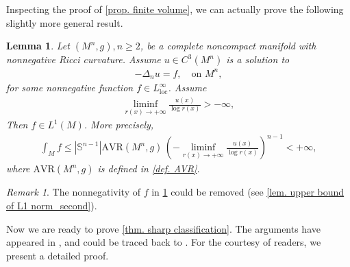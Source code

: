 \documentclass[12pt]{amsart}
\theoremstyle{plain}
\newtheorem{lemma}[theorem]{Lemma}
\theoremstyle{definition}
\theoremstyle{remark}     %
\newtheorem{remark}[theorem]{Remark}
\begin{document}
    Inspecting the proof of \cref{prop. finite volume}, we can actually prove the following slightly more general result.
    \begin{lemma}\label{lem. upper bound of L1 norm}
        Let $(M^n,g), n\geq 2$, be a complete noncompact manifold with nonnegative Ricci curvature. Assume $u\in C^3(M^n)$ is a solution to
    \begin{align*}
        -\Delta_n u=f,\quad
        \text{on }M^n,
    \end{align*}
    for some nonnegative function $f\in L^{\infty}_{\text{loc}}$. Assume 
    \begin{align*}
        \liminf_{r(x)\to+\infty}
        \frac{u(x)}{\log r(x)}>-\infty,
    \end{align*}
    Then $f\in L^1(M)$. More precisely,
    \begin{align*}
        \int_M f
        \leq |\mathbb{S}^{n-1}|\mathrm{AVR}(M^n,g)\, \left(
        -\liminf_{r(x)\to+\infty}
        \frac{u(x)}{\log r(x)}
        \right)^{n-1}<+\infty,
    \end{align*}
    where $\mathrm{AVR}(M^n,g)$ is defined in \cref{def. AVR}.
    \end{lemma}
    \begin{remark}
        The nonnegativity of $f$ in \cref{lem. upper bound of L1 norm} could be removed (see \cref{lem. upper bound of L1 norm_second}).
    \end{remark}


Now we are ready to prove \cref{thm. sharp classification}. The arguments have  appeared in \cite[Proposition 2.2]{CL24}, \cite[Lemma 4.1]{CMR26} and could be traced back to \cite[Lemma 1.1]{CL91}. For the courtesy of readers, we present a detailed proof.
\end{document}
